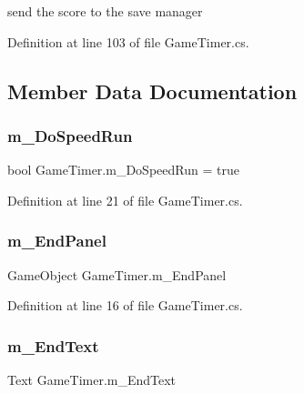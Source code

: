 send the score to the save manager 



Definition at line 103 of file Game\+Timer.\+cs.



\subsection{Member Data Documentation}
\mbox{\label{class_game_timer_a5570d9dfa184532926bb950503852d2d}} 
\subsubsection{\texorpdfstring{m\+\_\+\+Do\+Speed\+Run}{m\_DoSpeedRun}}
{\footnotesize\ttfamily bool Game\+Timer.\+m\+\_\+\+Do\+Speed\+Run = true}



Definition at line 21 of file Game\+Timer.\+cs.

\mbox{\label{class_game_timer_a637282ba9dad10e223642b69a8bc3704}} 
\subsubsection{\texorpdfstring{m\+\_\+\+End\+Panel}{m\_EndPanel}}
{\footnotesize\ttfamily Game\+Object Game\+Timer.\+m\+\_\+\+End\+Panel}



Definition at line 16 of file Game\+Timer.\+cs.

\mbox{\label{class_game_timer_a259af25e6db6814e21af2cf3c9e1ef8b}} 
\subsubsection{\texorpdfstring{m\+\_\+\+End\+Text}{m\_EndText}}
{\footnotesize\ttfamily Text Game\+Timer.\+m\+\_\+\+End\+Text}



